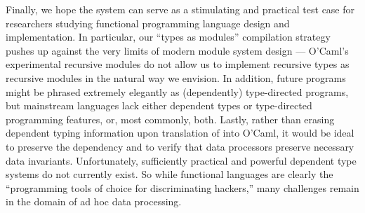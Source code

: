 Finally, we hope the \padsml{} system can serve as a stimulating and
practical test case for researchers studying functional programming language
design and implementation.  In particular, our ``types as modules'' 
compilation strategy pushes up against
the very limits of modern module system design --- O'Caml's experimental
recursive modules do not allow us to implement recursive types as
recursive modules in the natural way we envision.  
In addition, future \padsml{} programs
might be phrased extremely elegantly
as (dependently) type-directed programs, but mainstream
languages lack either dependent types or type-directed programming
features, or, most commonly, both.  Lastly, rather than erasing
dependent typing information upon translation of \padsml{} into O'Caml,
it would be ideal to preserve the dependency and to verify
that data processors preserve necessary data invariants.
Unfortunately,
sufficiently practical and powerful dependent type systems 
do not currently exist.  So while functional languages are clearly the
``programming tools of choice for discriminating hackers,''
many challenges remain in the domain of ad hoc data processing.







